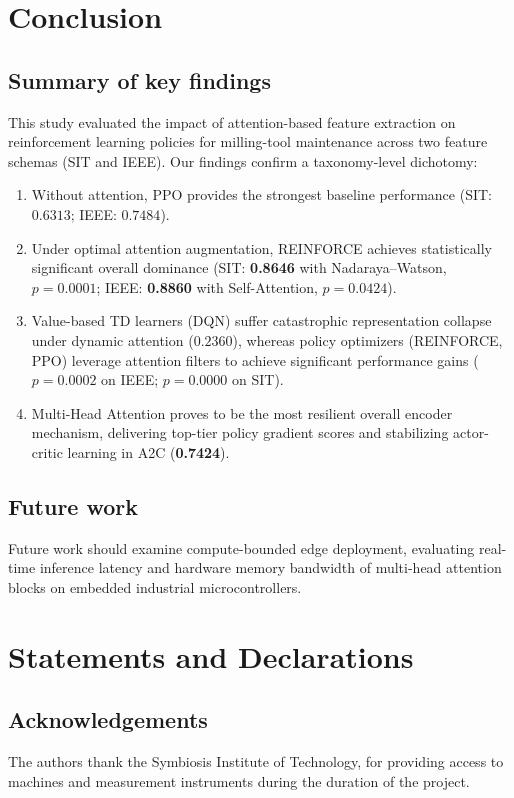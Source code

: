 \documentclass[sn-basic]{sn-jnl}%
\begin{document}
\section{Conclusion} \label{sec:conclusion}

\subsection{Summary of key findings}
This study evaluated the impact of attention-based feature extraction on reinforcement learning policies for milling-tool maintenance across two feature schemas (SIT and IEEE). Our findings confirm a taxonomy-level dichotomy:
\begin{enumerate}
    \item Without attention, \textsc{PPO} provides the strongest baseline performance (SIT: $0.6313$; IEEE: $0.7484$).
    \item Under optimal attention augmentation, \textsc{REINFORCE} achieves statistically significant overall dominance (SIT: \textbf{0.8646} with Nadaraya--Watson, $p = 0.0001$; IEEE: \textbf{0.8860} with Self-Attention, $p = 0.0424$).
    \item Value-based TD learners (\textsc{DQN}) suffer catastrophic representation collapse under dynamic attention ($0.2360$), whereas policy optimizers (\textsc{REINFORCE}, \textsc{PPO}) leverage attention filters to achieve significant performance gains ($p = 0.0002$ on IEEE; $p = 0.0000$ on SIT).
    \item Multi-Head Attention proves to be the most resilient overall encoder mechanism, delivering top-tier policy gradient scores and stabilizing actor-critic learning in \textsc{A2C} (\textbf{0.7424}).
\end{enumerate}

\subsection{Future work}
Future work should examine compute-bounded edge deployment, evaluating real-time inference latency and hardware memory bandwidth of multi-head attention blocks on embedded industrial microcontrollers.


\section*{Statements and Declarations}

\subsection*{Acknowledgements}
The authors thank the Symbiosis Institute of Technology, for providing access to machines and measurement instruments during the duration of the project.
\end{document}
